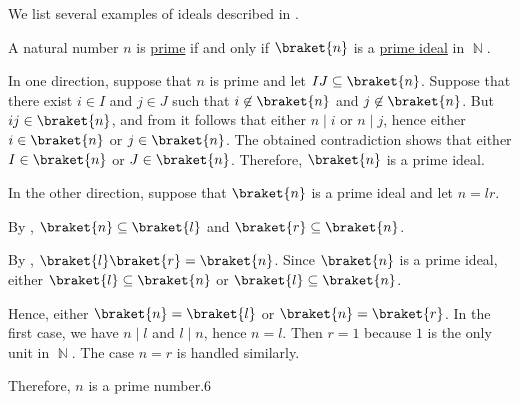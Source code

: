 \begin{example}\label{ex:def:derived_semiring_ideals}
  We list several examples of ideals described in .

  \begin{thmenum}
     A natural number \( n \) is \hyperref[def:prime_number]{prime} if and only if \( \braket{n} \) is a \hyperref[def:derived_semiring_ideals/prime]{prime ideal} in \( \BbbN \).

    In one direction, suppose that \( n \) is prime and let \( IJ \subseteq \braket{n} \). Suppose that there exist \( i \in I \) and \( j \in J \) such that \( i \not\in \braket{n} \) and \( j \not\in \braket{n} \). But \( ij \in \braket{n} \), and from  it follows that either \( n \mid i \) or \( n \mid j \), hence either \( i \in \braket{n} \) or \( j \in \braket{n} \). The obtained contradiction shows that either \( I \in \braket{n} \) or \( J \in \braket{n} \). Therefore, \( \braket{n} \) is a prime ideal.

    In the other direction, suppose that \( \braket{n} \) is a prime ideal and let \( n = lr \).

    By , \( \braket{n} \subseteq \braket{l} \) and \( \braket{r} \subseteq \braket{n} \).

    By , \( \braket{l} \braket{r} = \braket{n} \). Since \( \braket{n} \) is a prime ideal, either \( \braket{l} \subseteq \braket{n} \) or \( \braket{l} \subseteq \braket{n} \).

    Hence, either \( \braket{n} = \braket{l} \) or \( \braket{n} = \braket{r} \). In the first case, we have \( n \mid l \) and \( l \mid n \), hence \( n = l \). Then \( r = 1 \) because \( 1 \) is the only unit in \( \BbbN \). The case \( n = r \) is handled similarly.

    Therefore, \( n \) is a prime number.6
  \end{thmenum}
\end{example}

